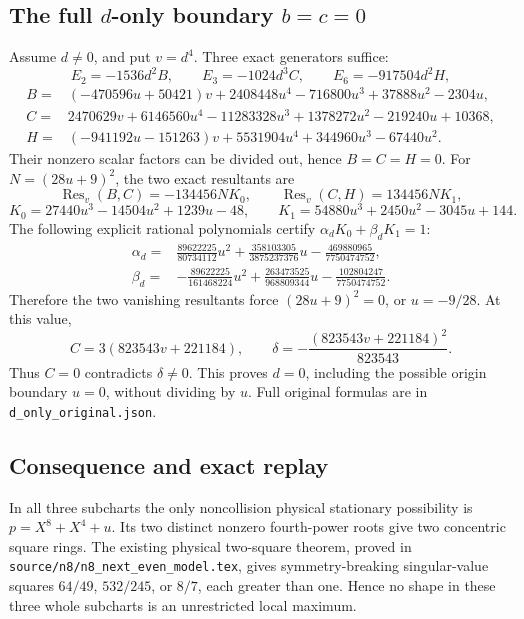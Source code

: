 \documentclass[11pt,a4paper]{article}
\theoremstyle{remark}
\begin{document}
\subsection{The full \texorpdfstring{\(d\)}{d}-only boundary \texorpdfstring{\(b=c=0\)}{b=c=0}}
Assume \(d\ne0\), and put \(v=d^4\). Three exact generators suffice:
\[
 E_2=-1536d^2B,\qquad E_3=-1024d^3C,\qquad
 E_6=-917504d^2H,
\]
\begin{align*}
 B={}&(-470596u+50421)v+
       2408448u^4-716800u^3+37888u^2-2304u,\\
 C={}&2470629v+6146560u^4-11283328u^3
           +1378272u^2-219240u+10368,\\
 H={}&(-941192u-151263)v+5531904u^4+344960u^3-67440u^2.
\end{align*}
Their nonzero scalar factors can be divided out, hence \(B=C=H=0\).
For \(N=(28u+9)^2\), the two exact resultants are
\[
 \operatorname{Res}_v(B,C)=-134456N K_0,\qquad
 \operatorname{Res}_v(C,H)=134456N K_1,
\]
\[
 K_0=27440u^3-14504u^2+1239u-48,\qquad
 K_1=54880u^3+2450u^2-3045u+144.
\]
The following explicit rational polynomials certify
\(\alpha_dK_0+\beta_dK_1=1\):
\begin{align*}
 \alpha_d={}&\frac{89622225}{80734112}u^2+
             \frac{358103305}{3875237376}u-
             \frac{469880965}{7750474752},\\
 \beta_d={}&-\frac{89622225}{161468224}u^2+
             \frac{263473525}{968809344}u-
             \frac{102804247}{7750474752}.
\end{align*}
Therefore the two vanishing resultants force \((28u+9)^2=0\), or
\(u=-9/28\). At this value,
\[
 C=3(823543v+221184),\qquad
 \delta=-\frac{(823543v+221184)^2}{823543}.
\]
Thus \(C=0\) contradicts \(\delta\ne0\). This proves \(d=0\),
including the possible origin boundary \(u=0\), without dividing by
\(u\). Full original formulas are in \texttt{d\_only\_original.json}.

\subsection{Consequence and exact replay}
In all three subcharts the only noncollision physical stationary
possibility is \(p=X^8+X^4+u\). Its two distinct nonzero fourth-power
roots give two concentric square rings. The existing physical
two-square theorem, proved in
\texttt{source/n8/n8\_next\_even\_model.tex},
gives symmetry-breaking singular-value squares
\(64/49\), \(532/245\), or \(8/7\), each greater than one.
Hence no shape in these three whole subcharts is an unrestricted
local maximum.
\end{document}
